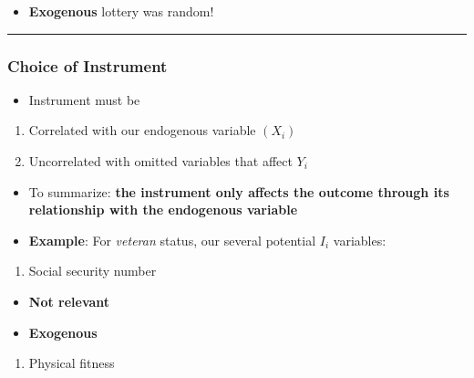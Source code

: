 \documentclass[
]{article}
\providecommand{\tightlist}{%
  \setlength{\itemsep}{0pt}\setlength{\parskip}{0pt}}
\begin{document}
\begin{itemize}
\tightlist
\item
  \textbf{Exogenous} lottery was random!
\end{itemize}

\begin{center}\rule{0.5\linewidth}{0.5pt}\end{center}

\hypertarget{choice-of-instrument}{%
\subsubsection{Choice of Instrument}\label{choice-of-instrument}}

\begin{itemize}
\tightlist
\item
  Instrument must be
\end{itemize}

\begin{enumerate}
\def\labelenumi{\arabic{enumi}.}
\tightlist
\item
  Correlated with our endogenous variable \((X_i)\)
\item
  Uncorrelated with omitted variables that affect \(Y_i\)
\end{enumerate}

\begin{itemize}
\item
  To summarize: \textbf{the instrument only affects the outcome through
  its relationship with the endogenous variable}
\item
  \textbf{Example}: For \emph{veteran} status, our several potential
  \(I_i\) variables:
\end{itemize}

\begin{enumerate}
\def\labelenumi{\arabic{enumi}.}
\tightlist
\item
  Social security number
\end{enumerate}

\begin{itemize}
\tightlist
\item
  \textbf{Not relevant}
\item
  \textbf{Exogenous}
\end{itemize}

\begin{enumerate}
\def\labelenumi{\arabic{enumi}.}
\setcounter{enumi}{1}
\tightlist
\item
  Physical fitness
\end{enumerate}
\end{document}
